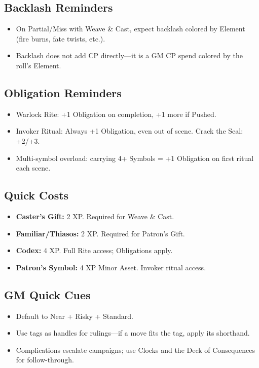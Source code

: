 \subsection{Backlash Reminders}
\begin{itemize}
  \item On Partial/Miss with Weave \& Cast, expect backlash colored by Element (fire burns, fate twists, etc.).
  \item Backlash does not add CP directly—it is a GM CP spend colored by the roll’s Element.
\end{itemize}

\subsection{Obligation Reminders}
\begin{itemize}
  \item Warlock Rite: +1 Obligation on completion, +1 more if Pushed.
  \item Invoker Ritual: Always +1 Obligation, even out of scene. Crack the Seal: +2/+3.
  \item Multi-symbol overload: carrying 4+ Symbols = +1 Obligation on first ritual each scene.
\end{itemize}

\subsection{Quick Costs}
\begin{itemize}
  \item \textbf{Caster’s Gift:} 2 XP. Required for Weave \& Cast.
  \item \textbf{Familiar/Thiasos:} 2 XP. Required for Patron’s Gift.
  \item \textbf{Codex:} 4 XP. Full Rite access; Obligations apply.
  \item \textbf{Patron’s Symbol:} 4 XP Minor Asset. Invoker ritual access.
\end{itemize}

\subsection{GM Quick Cues}
\begin{itemize}
  \item Default to Near + Risky + Standard.
  \item Use tags as handles for rulings—if a move fits the tag, apply its shorthand.
  \item Complications escalate campaigns; use Clocks and the Deck of Consequences for follow-through.
\end{itemize}
